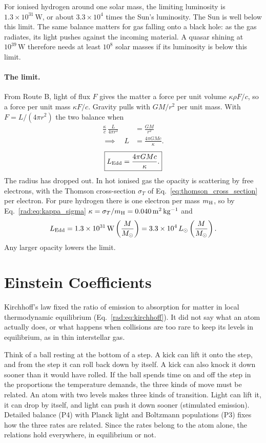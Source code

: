 For ionised hydrogen around one solar mass, the limiting luminosity is $1.3\times10^{31}\,\mathrm W$, or about $3.3\times10^4$ times the Sun's luminosity. The Sun is well below this limit. The same balance matters for gas falling onto a black hole: as the gas radiates, its light pushes against the incoming material. A quasar shining at $10^{39}\,\mathrm W$ therefore needs at least $10^8$ solar masses if its luminosity is below this limit.

\paragraph{The limit.} From Route B, light of flux $F$ gives the matter a force per unit volume $\kappa\rho F/c$, so a force per unit mass $\kappa F/c$. Gravity pulls with $GM/r^2$ per unit mass. With $F=L/(4\pi r^2)$ the two balance when
\begin{align}
	\frac{\kappa}{c}\,\frac{L}{4\pi r^2}
	&= \frac{GM}{r^2} \nonumber\\
	\implies\quad L
	&= \frac{4\pi GMc}{\kappa} .
\end{align}
\begin{equation}
	\boxed{L_{\rm Edd}=\frac{4\pi GMc}{\kappa}.}
	\label{rad:eq:eddington}
\end{equation}
The radius has dropped out. In hot ionised gas the opacity is scattering by free electrons, with the Thomson cross-section $\sigma_T$ of Eq.~\eqref{eq:thomson_cross_section} per electron. For pure hydrogen there is one electron per mass $m_{\rm H}$, so by Eq.~\eqref{rad:eq:kappa_sigma} $\kappa=\sigma_T/m_{\rm H}=0.040\,\mathrm{m^2\,kg^{-1}}$ and
\[
L_{\rm Edd}=1.3\times10^{31}\,\mathrm W\left(\frac{M}{M_\odot}\right)=3.3\times10^4\,L_\odot\left(\frac{M}{M_\odot}\right).
\]
Any larger opacity lowers the limit.

\section{Einstein Coefficients}
\label{rad:sec:lines}

Kirchhoff's law fixed the ratio of emission to absorption for matter in local thermodynamic equilibrium (Eq.~\eqref{rad:eq:kirchhoff}). It did not say what an atom actually does, or what happens when collisions are too rare to keep its levels in equilibrium, as in thin interstellar gas.

Think of a ball resting at the bottom of a step. A kick can lift it onto the step, and from the step it can roll back down by itself. A kick can also knock it down sooner than it would have rolled. If the ball spends time on and off the step in the proportions the temperature demands, the three kinds of move must be related. An atom with two levels makes three kinds of transition. Light can lift it, it can drop by itself, and light can push it down sooner (stimulated emission). Detailed balance (P4) with Planck light and Boltzmann populations (P3) fixes how the three rates are related. Since the rates belong to the atom alone, the relations hold everywhere, in equilibrium or not.

